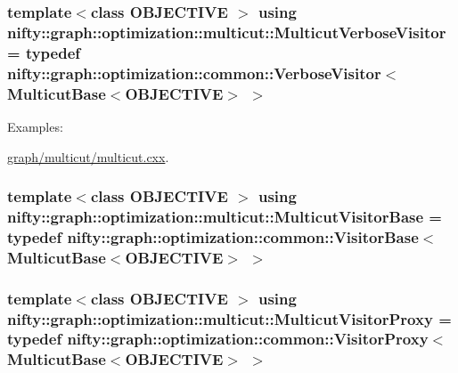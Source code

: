 \subsubsection[{Multicut\+Verbose\+Visitor}]{\setlength{\rightskip}{0pt plus 5cm}template$<$class O\+B\+J\+E\+C\+T\+I\+V\+E $>$ using {\bf nifty\+::graph\+::optimization\+::multicut\+::\+Multicut\+Verbose\+Visitor} = typedef {\bf nifty\+::graph\+::optimization\+::common\+::\+Verbose\+Visitor}$<$ {\bf Multicut\+Base}$<$O\+B\+J\+E\+C\+T\+I\+V\+E$>$ $>$}\label{namespacenifty_1_1graph_1_1optimization_1_1multicut_a071c9020e064373e9c11465fbe1870f9}
\begin{Desc}
\item[Examples\+: ]\par
\hyperlink{graph_2multicut_2multicut_8cxx-example}{graph/multicut/multicut.\+cxx}.\end{Desc}
\hypertarget{namespacenifty_1_1graph_1_1optimization_1_1multicut_ac347ba5e0f64a15fd2ad835dfc727b2b}{}
\subsubsection[{Multicut\+Visitor\+Base}]{\setlength{\rightskip}{0pt plus 5cm}template$<$class O\+B\+J\+E\+C\+T\+I\+V\+E $>$ using {\bf nifty\+::graph\+::optimization\+::multicut\+::\+Multicut\+Visitor\+Base} = typedef {\bf nifty\+::graph\+::optimization\+::common\+::\+Visitor\+Base}$<$ {\bf Multicut\+Base}$<$O\+B\+J\+E\+C\+T\+I\+V\+E$>$ $>$}\label{namespacenifty_1_1graph_1_1optimization_1_1multicut_ac347ba5e0f64a15fd2ad835dfc727b2b}
\hypertarget{namespacenifty_1_1graph_1_1optimization_1_1multicut_a555d6507d0e1cd8784e707a184448412}{}
\subsubsection[{Multicut\+Visitor\+Proxy}]{\setlength{\rightskip}{0pt plus 5cm}template$<$class O\+B\+J\+E\+C\+T\+I\+V\+E $>$ using {\bf nifty\+::graph\+::optimization\+::multicut\+::\+Multicut\+Visitor\+Proxy} = typedef {\bf nifty\+::graph\+::optimization\+::common\+::\+Visitor\+Proxy}$<$ {\bf Multicut\+Base}$<$O\+B\+J\+E\+C\+T\+I\+V\+E$>$ $>$}\label{namespacenifty_1_1graph_1_1optimization_1_1multicut_a555d6507d0e1cd8784e707a184448412}
\hypertarget{namespacenifty_1_1graph_1_1optimization_1_1multicut_a042a3be071d462ac11c49605edba1700}{}
